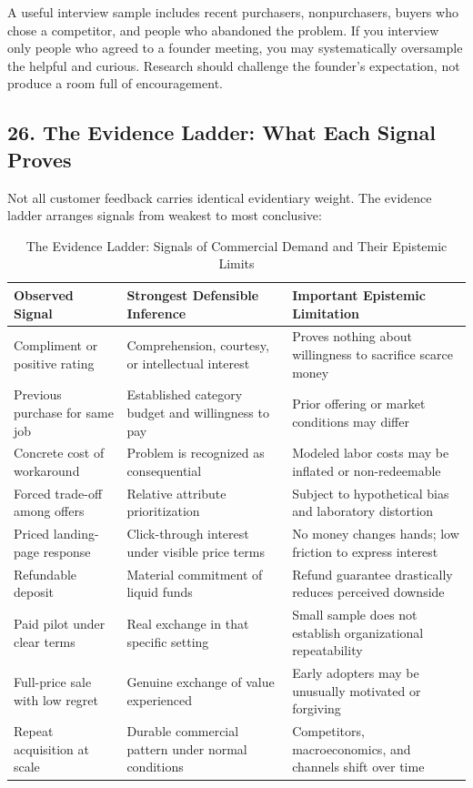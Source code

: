A useful interview sample includes recent purchasers, nonpurchasers, buyers who chose a competitor, and people who abandoned the problem. If you interview only people who agreed to a founder meeting, you may systematically oversample the helpful and curious. Research should challenge the founder's expectation, not produce a room full of encouragement.

\subsection*{26. The Evidence Ladder: What Each Signal Proves}

Not all customer feedback carries identical evidentiary weight. The evidence ladder arranges signals from weakest to most conclusive:

\begin{table}[t]
\centering
\small
\caption{The Evidence Ladder: Signals of Commercial Demand and Their Epistemic Limits}
\begin{tabularx}{\textwidth}{p{}p{}X}
\toprule
\textbf{Observed Signal} & \textbf{Strongest Defensible Inference} & \textbf{Important Epistemic Limitation} \\
\midrule
Compliment or positive rating & Comprehension, courtesy, or intellectual interest & Proves nothing about willingness to sacrifice scarce money \\
Previous purchase for same job & Established category budget and willingness to pay & Prior offering or market conditions may differ \\
Concrete cost of workaround & Problem is recognized as consequential & Modeled labor costs may be inflated or non-redeemable \\
Forced trade-off among offers & Relative attribute prioritization & Subject to hypothetical bias and laboratory distortion \\
Priced landing-page response & Click-through interest under visible price terms & No money changes hands; low friction to express interest \\
Refundable deposit & Material commitment of liquid funds & Refund guarantee drastically reduces perceived downside \\
Paid pilot under clear terms & Real exchange in that specific setting & Small sample does not establish organizational repeatability \\
Full-price sale with low regret & Genuine exchange of value experienced & Early adopters may be unusually motivated or forgiving \\
Repeat acquisition at scale & Durable commercial pattern under normal conditions & Competitors, macroeconomics, and channels shift over time \\
\bottomrule
\end{tabularx}
\end{table}

